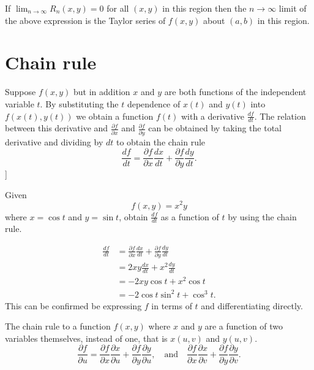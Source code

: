 If $\lim_{n \to \infty} R_{n}(x, y) = 0$ for all $(x, y)$ in this region then the $n \to \infty$ limit of the above expression is the Taylor series of $f(x, y)$ about $(a, b)$ in this region.


\section{Chain rule}

Suppose $f(x, y)$ but in addition $x$ and $y$ are both functions of the independent variable $t$. By substituting the $t$ dependence of $x(t)$ and $y(t)$ into $f(x(t), y(t))$ we obtain a function $f(t)$ with a derivative $\frac{df}{dt}$. The relation between this derivative and $\frac{\partial f}{\partial x}$ and $\frac{\partial f}{\partial y}$ can be obtained by taking the total derivative and dividing by $dt$ to obtain the chain rule \[ \frac{df}{dt} = \frac{\partial f}{\partial x} \frac{dx}{dt} + \frac{\partial f}{\partial y} \frac{dy}{dt}. \]]

\begin{example}
    Given \[ f(x, y) = x^2 y \] where $x = \cos{t}$ and $y = \sin{t}$, obtain $\frac{df}{dt}$ as a function of $t$ by using the chain rule.
    
    \begin{align*}
        \frac{df}{dt} &= \frac{\partial f}{\partial x} \frac{dx}{dt} + \frac{\partial f}{\partial y} \frac{dy}{dt} \\
        &= 2 x y \frac{dx}{dt} + x^2 \frac{dy}{dt} \\
        &= -2 x y \cos{t} + x^2 \cos{t} \\
        &= -2 \cos{t} \sin^2{t} + \cos^3{t}.
    \end{align*}
    This can be confirmed be expressing $f$ in terms of $t$ and differentiating directly.
\end{example}

The chain rule to a function $f(x, y)$ where $x$ and $y$ are a function of two variables themselves, instead of one, that is $x(u, v)$ and $y(u, v)$.
\[ \frac{\partial f}{\partial u} = \frac{\partial f}{\partial x} \frac{\partial x}{\partial u} + \frac{\partial f}{\partial y} \frac{\partial y}{\partial u}, \quad \text{and} \quad \frac{\partial f}{\partial x} \frac{\partial x}{\partial v} + \frac{\partial f}{\partial y} \frac{\partial y}{\partial v}. \]

